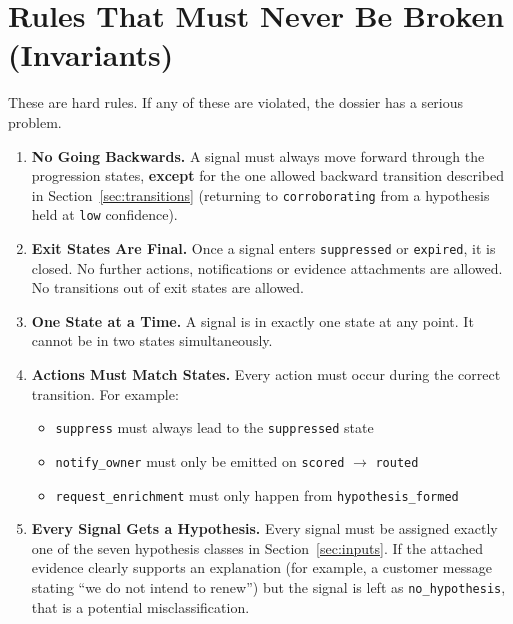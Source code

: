 \documentclass[11pt, a4paper]{article}
\begin{document}
\section{Rules That Must Never Be Broken (Invariants)}
\label{sec:invariants}

These are hard rules. If any of these are violated, the dossier has a serious problem.

\begin{enumerate}[leftmargin=*, label=\textbf{I\arabic*.}]

\item \textbf{No Going Backwards.}
A signal must always move forward through the progression states, \textbf{except} for the one allowed backward transition described in Section~\ref{sec:transitions} (returning to \texttt{corroborating} from a hypothesis held at \texttt{low} confidence).

\item \textbf{Exit States Are Final.}
Once a signal enters \texttt{suppressed} or \texttt{expired}, it is closed. No further actions, notifications or evidence attachments are allowed. No transitions out of exit states are allowed.

\item \textbf{One State at a Time.}
A signal is in exactly one state at any point. It cannot be in two states simultaneously.

\item \textbf{Actions Must Match States.}
Every action must occur during the correct transition. For example:
\begin{itemize}[nosep]
  \item \texttt{suppress} must always lead to the \texttt{suppressed} state
  \item \texttt{notify\_owner} must only be emitted on \texttt{scored} $\rightarrow$ \texttt{routed}
  \item \texttt{request\_enrichment} must only happen from \texttt{hypothesis\_formed}
\end{itemize}

\item \textbf{Every Signal Gets a Hypothesis.}
Every signal must be assigned exactly one of the seven hypothesis classes in Section~\ref{sec:inputs}. If the attached evidence clearly supports an explanation (for example, a customer message stating ``we do not intend to renew'') but the signal is left as \texttt{no\_hypothesis}, that is a potential misclassification.


\end{enumerate}
\end{document}
